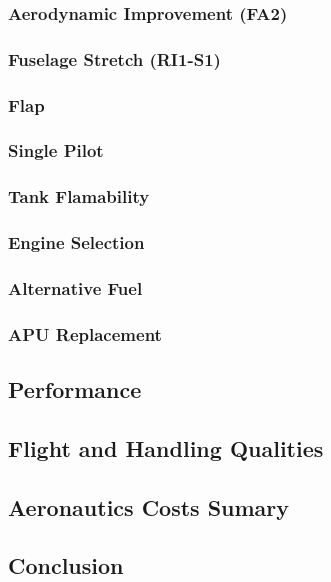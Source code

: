 	\subsubsection{Aerodynamic Improvement (FA2)}
		
	\subsubsection{Fuselage Stretch (RI1-S1)}
		
	\subsubsection{Flap}
		
	\subsubsection{Single Pilot}
		
	\subsubsection{Tank Flamability}
		
	\subsubsection{Engine Selection}
        	
	\subsubsection{Alternative Fuel}	
	        
	\subsubsection{APU Replacement}
		

\subsection{Performance}
         
		
\subsection{Flight and Handling Qualities}
	

\subsection{Aeronautics Costs Sumary}
	

\subsection{Conclusion}
	

